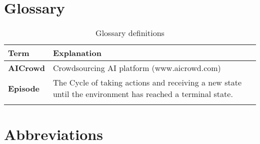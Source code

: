 %
%

\chapter*{Glossary}\label{chap.glossar}

\begin{longtable}{|m{3cm}|m{11cm}|}\hline
\rowcolor{gray} \textbf{Term}&
Explanation \\ \hline

\textbf{AICrowd}&
Crowdsourcing AI platform (www.aicrowd.com)\\ \hline

\textbf{Episode}&
The Cycle of taking actions and receiving a new state until the environment has reached a terminal state. \\ \hline





\caption{Glossary definitions}
	\label{tab:glossar}
\end{longtable}

\chapter*{Abbreviations}\label{cha:abkuerzungsverzeichnis}


